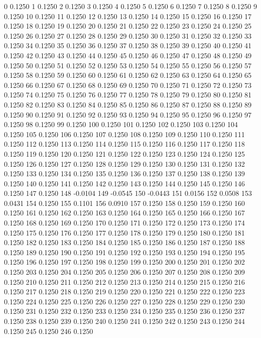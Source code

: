 0 0.1250
1 0.1250
2 0.1250
3 0.1250
4 0.1250
5 0.1250
6 0.1250
7 0.1250
8 0.1250
9 0.1250
10 0.1250
11 0.1250
12 0.1250
13 0.1250
14 0.1250
15 0.1250
16 0.1250
17 0.1250
18 0.1250
19 0.1250
20 0.1250
21 0.1250
22 0.1250
23 0.1250
24 0.1250
25 0.1250
26 0.1250
27 0.1250
28 0.1250
29 0.1250
30 0.1250
31 0.1250
32 0.1250
33 0.1250
34 0.1250
35 0.1250
36 0.1250
37 0.1250
38 0.1250
39 0.1250
40 0.1250
41 0.1250
42 0.1250
43 0.1250
44 0.1250
45 0.1250
46 0.1250
47 0.1250
48 0.1250
49 0.1250
50 0.1250
51 0.1250
52 0.1250
53 0.1250
54 0.1250
55 0.1250
56 0.1250
57 0.1250
58 0.1250
59 0.1250
60 0.1250
61 0.1250
62 0.1250
63 0.1250
64 0.1250
65 0.1250
66 0.1250
67 0.1250
68 0.1250
69 0.1250
70 0.1250
71 0.1250
72 0.1250
73 0.1250
74 0.1250
75 0.1250
76 0.1250
77 0.1250
78 0.1250
79 0.1250
80 0.1250
81 0.1250
82 0.1250
83 0.1250
84 0.1250
85 0.1250
86 0.1250
87 0.1250
88 0.1250
89 0.1250
90 0.1250
91 0.1250
92 0.1250
93 0.1250
94 0.1250
95 0.1250
96 0.1250
97 0.1250
98 0.1250
99 0.1250
100 0.1250
101 0.1250
102 0.1250
103 0.1250
104 0.1250
105 0.1250
106 0.1250
107 0.1250
108 0.1250
109 0.1250
110 0.1250
111 0.1250
112 0.1250
113 0.1250
114 0.1250
115 0.1250
116 0.1250
117 0.1250
118 0.1250
119 0.1250
120 0.1250
121 0.1250
122 0.1250
123 0.1250
124 0.1250
125 0.1250
126 0.1250
127 0.1250
128 0.1250
129 0.1250
130 0.1250
131 0.1250
132 0.1250
133 0.1250
134 0.1250
135 0.1250
136 0.1250
137 0.1250
138 0.1250
139 0.1250
140 0.1250
141 0.1250
142 0.1250
143 0.1250
144 0.1250
145 0.1250
146 0.1250
147 0.1250
148 -0.0104
149 -0.0545
150 -0.0443
151 0.0156
152 0.0508
153 0.0431
154 0.1250
155 0.1101
156 0.0910
157 0.1250
158 0.1250
159 0.1250
160 0.1250
161 0.1250
162 0.1250
163 0.1250
164 0.1250
165 0.1250
166 0.1250
167 0.1250
168 0.1250
169 0.1250
170 0.1250
171 0.1250
172 0.1250
173 0.1250
174 0.1250
175 0.1250
176 0.1250
177 0.1250
178 0.1250
179 0.1250
180 0.1250
181 0.1250
182 0.1250
183 0.1250
184 0.1250
185 0.1250
186 0.1250
187 0.1250
188 0.1250
189 0.1250
190 0.1250
191 0.1250
192 0.1250
193 0.1250
194 0.1250
195 0.1250
196 0.1250
197 0.1250
198 0.1250
199 0.1250
200 0.1250
201 0.1250
202 0.1250
203 0.1250
204 0.1250
205 0.1250
206 0.1250
207 0.1250
208 0.1250
209 0.1250
210 0.1250
211 0.1250
212 0.1250
213 0.1250
214 0.1250
215 0.1250
216 0.1250
217 0.1250
218 0.1250
219 0.1250
220 0.1250
221 0.1250
222 0.1250
223 0.1250
224 0.1250
225 0.1250
226 0.1250
227 0.1250
228 0.1250
229 0.1250
230 0.1250
231 0.1250
232 0.1250
233 0.1250
234 0.1250
235 0.1250
236 0.1250
237 0.1250
238 0.1250
239 0.1250
240 0.1250
241 0.1250
242 0.1250
243 0.1250
244 0.1250
245 0.1250
246 0.1250
